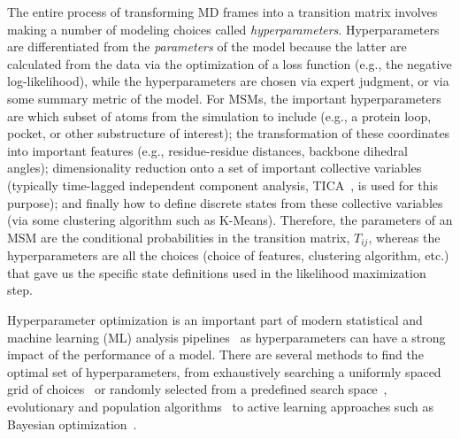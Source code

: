 \documentclass[journal=jacsat,manuscript=article]{achemso}
\begin{document}
The entire process of transforming MD frames into a transition matrix involves making a number of modeling choices called \emph{hyperparameters}. Hyperparameters are differentiated from the \emph{parameters} of the model because the latter are calculated from the data via the optimization of a loss function (e.g., the negative log-likelihood), while the hyperparameters are chosen via expert judgment, or via some summary metric of the model\cite{feurer2019hyperparameter}. 
For MSMs, the important hyperparameters~\cite{Optimized_2016, scherer_variational_2019, husic_markov_2018} are which subset of atoms from the simulation to include (e.g., a protein loop, pocket, or other substructure of interest); the transformation of these coordinates into important features (e.g., residue-residue distances, backbone dihedral angles); dimensionality reduction onto a set of important collective variables (typically time-lagged independent component analysis, TICA~\cite{perez-hernandezIdentificationSlowMolecular2013a}, is used for this purpose); and finally how to define discrete states from these collective variables (via some clustering algorithm such as K-Means). Therefore, the parameters of an MSM are the conditional probabilities in the transition matrix, $T_{ij}$, whereas the hyperparameters are all the choices (choice of features, clustering algorithm, etc.) that gave us the specific state definitions used in the likelihood maximization step.   

Hyperparameter optimization is an important part of modern statistical and machine learning (ML) analysis pipelines~\cite{feurer2019hyperparameter, bergstra_jamesbergstra_random_2012, bergstra_making_2013, bergstraAlgorithmsHyperParameterOptimizationa} as hyperparameters can have a strong impact of the performance of a model. There are several methods to find the optimal set of hyperparameters, from exhaustively searching a uniformly spaced grid of choices~\cite{c1997montgomery} or randomly selected from a predefined search space~\cite{bergstra_jamesbergstra_random_2012}, evolutionary and population algorithms~\cite{simon2013evolutionary, kennedyParticleSwarmOptimization1995, eberhart1998comparison, hansenCMAEvolutionStrategy2016} to active learning approaches such as Bayesian optimization~\cite{hutterSequentialModelbasedOptimization2011, bergstraAlgorithmsHyperParameterOptimizationa, NIPS2012_4522, bergstraMakingScienceModel2013}.
\end{document}
